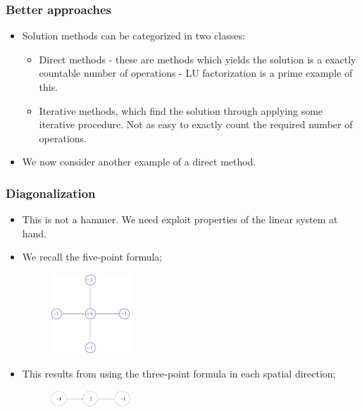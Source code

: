 \documentclass{beamer}
\begin{document}
\begin{frame}\frametitle{Better approaches}
  \begin{itemize}
    \item Solution methods can be categorized in two classes: 
      \begin{itemize}
        \item Direct methods - these are methods which yields the solution is
          a exactly countable number of operations - LU factorization is a prime example of this.
        \item Iterative methods, which find the solution through applying some
          iterative procedure. Not as easy to exactly count the required number
          of operations.
      \end{itemize}
    \item We now consider another example of a direct method.
  \end{itemize}
\end{frame}
\begin{frame}\frametitle{Diagonalization}
  \begin{itemize}
    \item This is not a hammer. We need exploit properties of the linear system at hand.
    \item We recall the five-point formula;
      \begin{figure}[H]
        \begin{center}
          \includegraphics[width=3cm]{../../notes/07.poisson-fdm/FivePointStencil}
        \end{center}
      \end{figure}
    \item This results from using the three-point formula in each spatial direction;
      \begin{figure}[H]
        \begin{center}
          \includegraphics[width=3cm]{../../notes/07.poisson-fdm/ThreePointStencil}
        \end{center}
      \end{figure}
  \end{itemize}
\end{frame}
\end{document}
